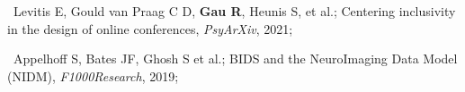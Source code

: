 \textbullet~Levitis E, Gould van Praag C D, \textbf{Gau R}, Heunis S, et al.;
Centering inclusivity in the design of online conferences,
\textit{PsyArXiv},
2021; 

\textbullet~Appelhoff S, Bates JF, Ghosh S et al.;
BIDS and the NeuroImaging Data Model (NIDM), 
\textit{F1000Research},
2019;
